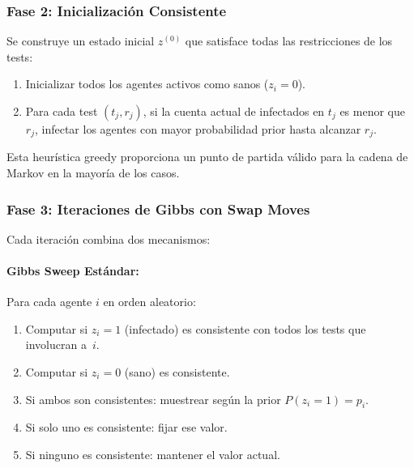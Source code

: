 \documentclass[11pt, a4paper]{article}
\begin{document}
\subsubsection{Fase 2: Inicializaci\'on Consistente}
Se construye un estado inicial $z^{(0)}$ que satisface todas las
restricciones de los tests:
\begin{enumerate}[nosep]
    \item Inicializar todos los agentes activos como sanos ($z_i = 0$).
    \item Para cada test $(t_j, r_j)$, si la cuenta actual de infectados
    en $t_j$ es menor que $r_j$, infectar los agentes con mayor
    probabilidad prior hasta alcanzar $r_j$.
\end{enumerate}

Esta heur\'istica greedy proporciona un punto de partida v\'alido para
la cadena de Markov en la mayor\'ia de los casos.

\subsubsection{Fase 3: Iteraciones de Gibbs con Swap Moves}
Cada iteraci\'on combina dos mecanismos:

\paragraph{Gibbs Sweep Est\'andar:}
Para cada agente $i$ en orden aleatorio:
\begin{enumerate}[nosep]
    \item Computar si $z_i = 1$ (infectado) es consistente con todos los
    tests que involucran a~$i$.
    \item Computar si $z_i = 0$ (sano) es consistente.
    \item Si ambos son consistentes: muestrear seg\'un la prior
    $P(z_i = 1) = p_i$.
    \item Si solo uno es consistente: fijar ese valor.
    \item Si ninguno es consistente: mantener el valor actual.
\end{enumerate}
\end{document}

